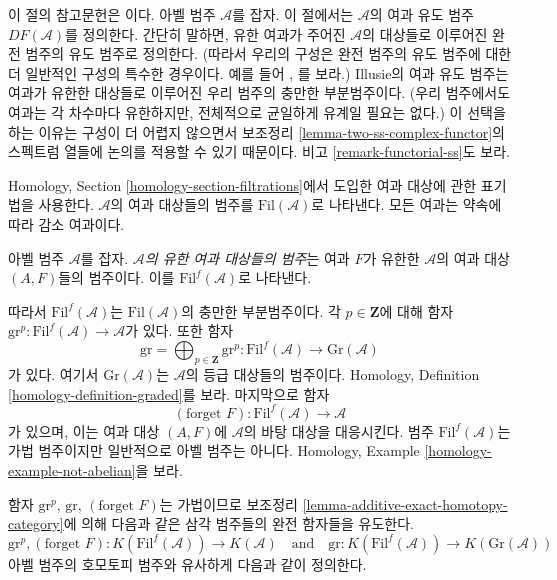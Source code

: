 \noindent
이 절의 참고문헌은 \cite[I, Chapter V]{cotangent}이다. 아벨 범주
$\mathcal{A}$를 잡자. 이 절에서는 $\mathcal{A}$의 여과 유도 범주
$DF(\mathcal{A})$를 정의한다. 간단히 말하면, 유한 여과가 주어진
$\mathcal{A}$의 대상들로 이루어진 완전 범주의 유도 범주로 정의한다.
(따라서 우리의 구성은 완전 범주의 유도 범주에 대한 더 일반적인 구성의
특수한 경우이다. 예를 들어 \cite{Buhler}, \cite{Keller}를 보라.)
Illusie의 여과 유도 범주는 여과가 유한한 대상들로 이루어진 우리 범주의
충만한 부분범주이다. (우리 범주에서도 여과는 각 차수마다 유한하지만,
전체적으로 균일하게 유계일 필요는 없다.) 이 선택을 하는 이유는 구성이
더 어렵지 않으면서 보조정리 \ref{lemma-two-ss-complex-functor}의
스펙트럼 열들에 논의를 적용할 수 있기 때문이다. 비고
\ref{remark-functorial-ss}도 보라.

\medskip\noindent
Homology, Section \ref{homology-section-filtrations}에서 도입한 여과 대상에
관한 표기법을 사용한다. $\mathcal{A}$의 여과 대상들의 범주를
$\text{Fil}(\mathcal{A})$로 나타낸다. 모든 여과는 약속에 따라 감소 여과이다.

\begin{definition}
\label{definition-finite-filtered}
아벨 범주 $\mathcal{A}$를 잡자. {\it $\mathcal{A}$의 유한 여과 대상들의
범주}는 여과 $F$가 유한한 $\mathcal{A}$의 여과 대상 $(A, F)$들의
범주이다. 이를 $\text{Fil}^f(\mathcal{A})$로 나타낸다.
\end{definition}

\noindent
따라서 $\text{Fil}^f(\mathcal{A})$는 $\text{Fil}(\mathcal{A})$의
충만한 부분범주이다. 각 $p \in \mathbf{Z}$에 대해 함자
$\text{gr}^p : \text{Fil}^f(\mathcal{A}) \to \mathcal{A}$가 있다.
또한 함자
$$
\text{gr} = \bigoplus\nolimits_{p \in \mathbf{Z}} \text{gr}^p :
\text{Fil}^f(\mathcal{A}) \to \text{Gr}(\mathcal{A})
$$
가 있다. 여기서 $\text{Gr}(\mathcal{A})$는 $\mathcal{A}$의 등급 대상들의
범주이다. Homology, Definition \ref{homology-definition-graded}를 보라.
마지막으로 함자
$$
(\text{forget }F) : \text{Fil}^f(\mathcal{A}) \longrightarrow \mathcal{A}
$$
가 있으며, 이는 여과 대상 $(A, F)$에 $\mathcal{A}$의 바탕 대상을
대응시킨다. 범주 $\text{Fil}^f(\mathcal{A})$는 가법 범주이지만
일반적으로 아벨 범주는 아니다. Homology, Example
\ref{homology-example-not-abelian}을 보라.

\medskip\noindent
함자 $\text{gr}^p$, $\text{gr}$, $(\text{forget }F)$는 가법이므로
보조정리 \ref{lemma-additive-exact-homotopy-category}에 의해 다음과 같은
삼각 범주들의 완전 함자들을 유도한다.
$$
\text{gr}^p, (\text{forget }F) :
K(\text{Fil}^f(\mathcal{A}))
\to
K(\mathcal{A})
\quad\text{and}\quad
\text{gr} :
K(\text{Fil}^f(\mathcal{A}))
\to
K(\text{Gr}(\mathcal{A}))
$$
아벨 범주의 호모토피 범주와 유사하게 다음과 같이 정의한다.

